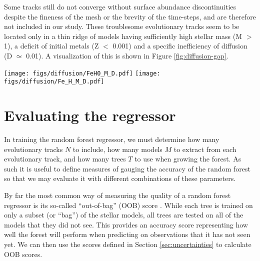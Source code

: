 \documentclass[twocolumn,twocolappendix]{aastex6}
\newif\ifref
\newcommand{\mb}[1]{\ifref\boldmath\textbf{#1}\unboldmath\else #1\fi}
\begin{document}
Some tracks still do not converge without surface abundance discontinuities despite the fineness of the mesh or the brevity of the time-steps, and are therefore not included in our study. These troublesome evolutionary tracks seem to be located only in a thin ridge of models having sufficiently high stellar mass (M $>$ 1), a deficit of initial metals (Z $<$ 0.001) and a specific inefficiency of diffusion (D $\simeq$ 0.01). A visualization of this \mb{is shown} in Figure \ref{fig:diffusion-gap}.

\begin{figure*}
    \centering
    \texttt{[image: figs/diffusion/FeH0\_M\_D.pdf]}\hfill
    \texttt{[image: figs/diffusion/Fe\_H\_M\_D.pdf]}
    \caption{Stellar mass as a function of diffusion \mb{multiplication} factor colored by initial surface metallicity (left) and final surface metallicity (right). A ridge of \mb{missing points indicating} unconverged evolutionary tracks can be seen around a diffusion \mb{multiplication} factor of 0.01. Beyond this ridge, tracks that were initially metal-poor end their main-sequence lives with all of their metals drained from their surfaces. \label{fig:diffusion-gap} }
\end{figure*}


\section{Evaluating the regressor}
\label{sec:evaluation}
In training the random forest regressor, we must determine how many evolutionary tracks $N$ to include, how many models $M$ to extract from each evolutionary track, and how many trees $T$ to use when growing the forest. As such it is useful to define measures of gauging the accuracy of the random forest so that we may evaluate it with different combinations of these parameters. 

By far the most common way of measuring the quality of a random forest regressor is its so-called ``out-of-bag'' (OOB) score \citep[see e.g.\ section 3.1 of][]{breiman2001random}. While each tree is trained on only a subset (or ``bag'') of the stellar models, all trees are tested on all of the models that they did not see. This provides an accuracy score representing how well the forest will perform when predicting on observations that it has not seen yet. We can then use the scores defined in Section \ref{sec:uncertainties} to calculate OOB scores. 
\end{document}
